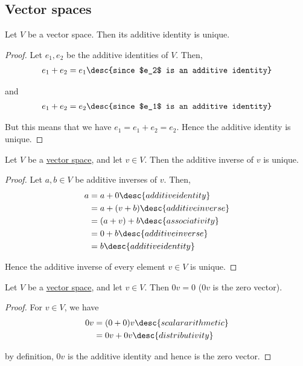 \subsection{Vector spaces}\label{f7b8de8}

\label{c444473}

Let $V$ be a vector space. Then its additive identity is unique.

\begin{proof}
  Let $e_1,e_2$ be the additive identities of $V$. Then,
  \begin{align*}
    e_1+e_2=e_1\desc{since $e_2$ is an additive identity}
  \end{align*}

  and
  \begin{align*}
    e_1+e_2=e_2\desc{since $e_1$ is an additive identity}
  \end{align*}

  But this means that we have $e_1=e_1+e_2=e_2$. Hence the additive identity is
  unique.
\end{proof}

\label{cb813a5}

Let $V$ be a \href{fc83050}{vector space}, and let $v\in V$. Then the additive
inverse of $v$ is unique.

\begin{proof}
  Let $a,b\in V$ be additive inverses of $v$. Then,
  \begin{align*}
    a &=a+0\desc{additive identity}    \\
      &=a+(v+b)\desc{additive inverse} \\
      &=(a+v)+b\desc{associativity}    \\
      &=0+b\desc{additive inverse}     \\
      &=b\desc{additive identity}
  \end{align*}

  Hence the additive inverse of every element $v\in V$ is unique.
\end{proof}

\label{ab62bb9}

Let $V$ be a \href{fc83050}{vector space}, and let $v\in V$. Then $0v=0$ ($0v$
is the zero vector).

\begin{proof}
  For $v\in V$, we have
  \begin{align*}
    0v &=(0+0)v\desc{scalar arithmetic} \\
       &=0v+0v\desc{distributivity}
  \end{align*}

  by definition, $0v$ is the additive identity and hence is the zero vector.
\end{proof}


